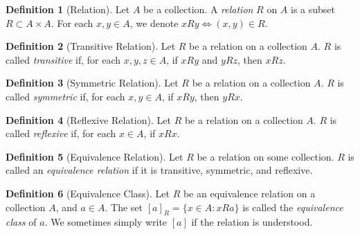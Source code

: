 \documentclass{article}
\theoremstyle{definition}
\newtheorem{definition}{Definition}[subsection]
\begin{document}
\begin{definition}[Relation]
    Let $A$ be a collection. A \textit{relation} $R$ on $A$ is a subset $R\subset A\times A$. For each $x,y\in A$, we denote $xRy \iff (x,y)\in R$. 
\end{definition}
\begin{definition}[Transitive Relation]
    Let $R$ be a relation on a collection $A$. $R$ is called \textit{transitive} if, for each $x,y,z\in A$, if $xRy$ and $yRz$, then $xRz$.   
\end{definition}
\begin{definition}[Symmetric Relation]
    Let $R$ be a relation on a collection $A$. $R$ is called \textit{symmetric} if, for each $x,y\in A$, if $xRy$, then $yRx$.   
\end{definition}
\begin{definition}[Reflexive Relation]
    Let $R$ be a relation on a collection $A$. $R$ is called \textit{reflexive} if, for each $x\in A$, if $xRx$.   
\end{definition}
\begin{definition}[Equivalence Relation]
    Let $R$ be a relation on some collection. $R$ is called an \textit{equivalence relation} if it is transitive, symmetric, and reflexive.
\end{definition}
\begin{definition}[Equivalence Class]
    Let $R$ be an equivalence relation on a collection $A$, and $a\in A$. The set $[a]_R=\{x\in A:xRa\}$ is called the \textit{equivalence class} of $a$. We sometimes simply write $[a]$ if the relation is understood.
\end{definition}
\end{document}
